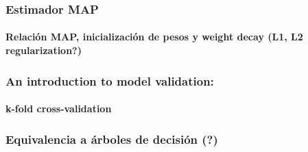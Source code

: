 \hypertarget{estimador-map}{%
\subsubsection{Estimador MAP}\label{estimador-map}}

\hypertarget{relaciuxf3n-map-inicializaciuxf3n-de-pesos-y-weight-decay-l1-l2-regularization}{%
\paragraph{Relación MAP, inicialización de pesos y weight decay (L1, L2
regularization?)}\label{relaciuxf3n-map-inicializaciuxf3n-de-pesos-y-weight-decay-l1-l2-regularization}}

\hypertarget{an-introduction-to-model-validation}{%
\subsubsection{An introduction to model
validation:}\label{an-introduction-to-model-validation}}

\hypertarget{k-fold-cross-validation}{%
\paragraph{k-fold cross-validation}\label{k-fold-cross-validation}}

\hypertarget{equivalencia-a-uxe1rboles-de-decisiuxf3n}{%
\subsubsection{Equivalencia a árboles de decisión
(?)}\label{equivalencia-a-uxe1rboles-de-decisiuxf3n}}
